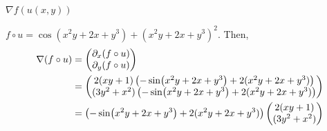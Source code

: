 $\nabla f(u(x,y))$

\soln* $f \circ u = \cos(x^2 y + 2x + y^3) + (x^2y + 2x + y^3)^2$. Then,
\begin{align*}
    \nabla (f \circ u) &= \vvec{\partial_x (f \circ u)}{\partial_y (f \circ u)}\\
    &= \vvec{
        2(xy + 1) \pars{-\sin(x^2 y + 2x + y^3)+ 2(x^2y + 2x + y^3) }
    } {
        (3y^2 + x^2) \pars{-\sin(x^2 y + 2x + y^3)+ 2(x^2y + 2x + y^3) }
    } \\
    &=  \pars{-\sin(x^2 y + 2x + y^3)+ 2(x^2y + 2x + y^3) } \vvec{
        2(xy + 1)
    }{
        (3y^2 + x^2)
    }
\end{align*}